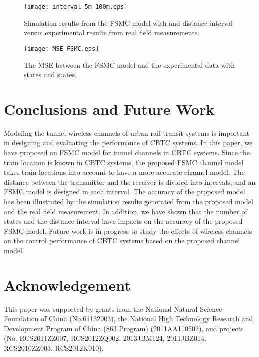 \documentclass[conference]{IEEEtran}
\begin{document}
\begin{figure}[tp]
\centering
\texttt{[image: interval\_5m\_100m.eps]}
\caption{Simulation results from the FSMC model with  and  distance interval versus experimental results from real field measurements.}
\label{5m}

\centering
\texttt{[image: MSE\_FSMC.eps]}
\caption{The MSE between the FSMC model and the experimental data with  states and  states.}
\label{MSE}
\end{figure}

\section{Conclusions and Future Work}
\label{Sec_CandF}
Modeling the tunnel wireless channels of urban rail transit systems is important in designing and evaluating the performance of CBTC systems. In this paper, we have proposed an FSMC model for tunnel channels in CBTC systems. Since the train location is known in CBTC systems, the proposed FSMC channel model takes train locations into account to have a more accurate channel model. The distance between the transmitter and the receiver is divided into intervals, and an FSMC model is designed in each interval. The accuracy of the proposed model has been illustrated by the simulation results generated from the proposed model and the real field measurement. In addition,  we have shown that the  number of states and the distance interval have impacts on the accuracy of the proposed FSMC model. Future work is in progress to study the effects of  wireless channels on the control performance of CBTC systems based on the proposed channel model.

\section*{Acknowledgement}This paper was supported by grants from the National Natural Science Foundation of China (No.61132003), the National High Technology Research and Development Program of China (863 Program) (2011AA110502), and projects (No. RCS2011ZZ007, RCS2012ZQ002, 2013JBM124, 2011JBZ014, RCS2010ZZ003, RCS2012K010).




\end{document}
